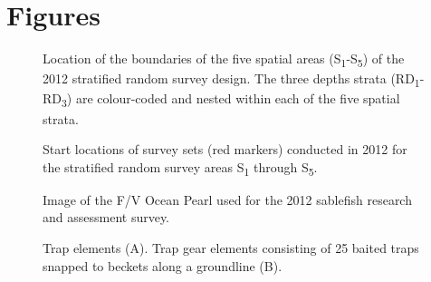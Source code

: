 \documentclass[12pt]{article}\usepackage[]{graphicx}\usepackage[]{color}
\begin{document}
\clearpage

\hypertarget{figures}{%
\section{Figures}\label{figures}}


\begin{figure}[htb]

{\centering {} 

}

\caption{Location of the boundaries of the five spatial areas (S\textsubscript{1}-S\textsubscript{5}) of the 2012 stratified random survey design. The three depths strata (RD\textsubscript{1}-RD\textsubscript{3}) are colour-coded and nested within each of the five spatial strata.}\label{fig:figure1}
\end{figure}
\clearpage


\begin{figure}[htb]

{\centering {} 

}

\caption{Start locations of survey sets (red markers) conducted in 2012 for the stratified random survey areas S\textsubscript{1} through S\textsubscript{5}.}\label{fig:figure2}
\end{figure}
\clearpage


\begin{figure}[htb]

{\centering {} 

}

\caption{Image of the F/V Ocean Pearl used for the 2012 sablefish research and assessment survey.}\label{fig:figure3}
\end{figure}
\clearpage


\begin{figure}[htb]

{\centering {} 

}

\caption{Trap elements (A). Trap gear elements consisting of 25 baited traps snapped to beckets along a groundline (B).}\label{fig:figure4}
\end{figure}
\clearpage
\end{document}
